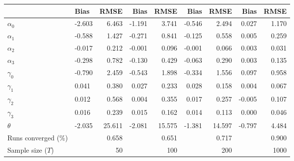 
\begin{tabular}[t]{llrrrrrrr}
\toprule
  & Bias & RMSE & Bias & RMSE & Bias & RMSE & Bias & RMSE\\
\midrule
$\alpha_{0}$ & -2.603 & 6.463 & -1.191 & 3.741 & -0.546 & 2.494 & 0.027 & 1.170\\
$\alpha_{1}$ & -0.588 & 1.427 & -0.271 & 0.841 & -0.125 & 0.558 & 0.005 & 0.259\\
$\alpha_{2}$ & -0.017 & 0.212 & -0.001 & 0.096 & -0.001 & 0.066 & 0.003 & 0.031\\
$\alpha_{3}$ & -0.298 & 0.782 & -0.130 & 0.429 & -0.063 & 0.290 & 0.003 & 0.135\\
$\gamma_{0}$ & -0.790 & 2.459 & -0.543 & 1.898 & -0.334 & 1.556 & 0.097 & 0.958\\
$\gamma_{1}$ & 0.041 & 0.380 & 0.027 & 0.233 & 0.028 & 0.158 & 0.004 & 0.067\\
$\gamma_{2}$ & 0.012 & 0.568 & 0.004 & 0.355 & 0.017 & 0.257 & -0.005 & 0.107\\
$\gamma_{3}$ & 0.016 & 0.239 & 0.015 & 0.162 & 0.014 & 0.113 & 0.000 & 0.046\\
$\theta$ & -2.035 & 25.611 & -2.081 & 15.575 & -1.381 & 14.597 & -0.797 & 4.484\\
Runs converged (\%) &  & 0.658 &  & 0.651 &  & 0.717 &  & 0.900\\
Sample size ($T$) &  & 50 &  & 100 &  & 200 &  & 1000\\
\bottomrule
\end{tabular}
